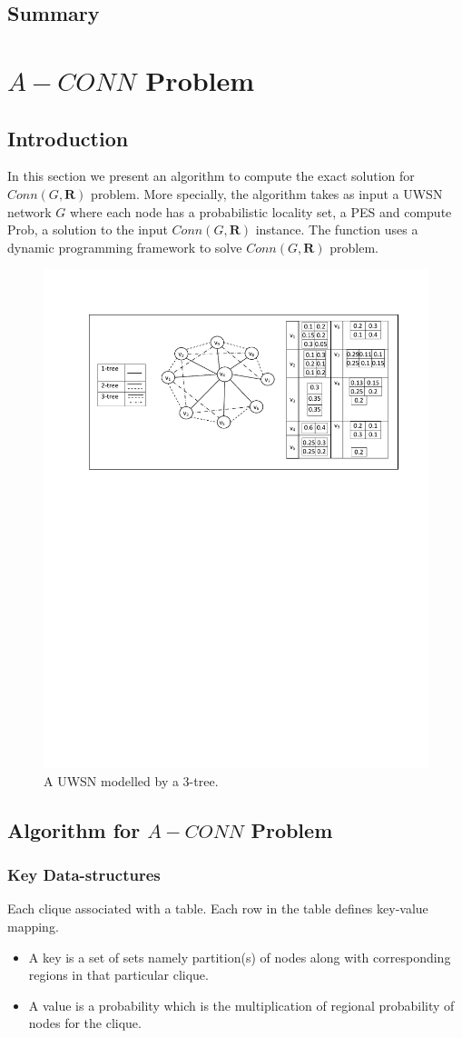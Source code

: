 \documentclass[12pt]{article}
\begin{document}
\subsection{Summary}





\section{$A-CONN$ Problem}
\label{subsec:mainAlg}
\subsection{Introduction}
In this section we present an algorithm to compute the exact solution for $Conn(G,\textbf{R})$ problem. More specially, the algorithm  takes as input a UWSN network $G$ where each node has a probabilistic locality set, a PES and compute Prob, a solution to the input $Conn(G,\textbf{R})$ instance. The function uses a dynamic programming framework to solve $Conn(G,\textbf{R})$ problem.\\
\begin{figure}[h]
\centering
\includegraphics[width=5 in, height=2.5 in]{Example1.pdf}
 \caption{ A UWSN modelled by a $3$-tree.
 \label{fig:3t}
}
\end{figure}
\subsection{Algorithm for $A-CONN$ Problem}
\subsubsection{Key Data-structures}
\label{subsec:kds}
Each clique associated with a table. Each row in the table defines key-value mapping.
\begin{itemize}[noitemsep,nolistsep]
\item A key is a set of sets namely partition(s) of nodes along with corresponding regions in that particular clique. 
\item A value is a probability which is the multiplication of regional probability of nodes for the clique.
\end{itemize}
\end{document}
